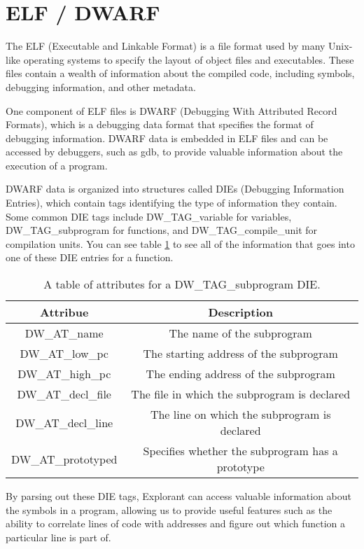 \section{ELF / DWARF}
The ELF (Executable and Linkable Format) is a file format used by many Unix-like operating systems to specify the layout of object files and executables. These files contain a wealth of information about the compiled code, including symbols, debugging information, and other metadata.

One component of ELF files is DWARF (Debugging With Attributed Record Formats), which is a debugging data format that specifies the format of debugging information. DWARF data is embedded in ELF files and can be accessed by debuggers, such as gdb, to provide valuable information about the execution of a program.

DWARF data is organized into structures called DIEs (Debugging Information Entries), which contain tags identifying the type of information they contain. Some common DIE tags include DW\_TAG\_variable for variables, DW\_TAG\_subprogram for functions, and DW\_TAG\_compile\_unit for compilation units. You can see table \ref{fig:subprogram_die} to see all of the information that goes into one of these DIE entries for a function.  

\begin{table}
\centering
\begin{tabular}{|c|c|}
\hline
\textbf{Attribue} & \textbf{Description} \\ \hline
DW\_AT\_name & The name of the subprogram \\ \hline
DW\_AT\_low\_pc & The starting address of the subprogram \\ \hline
DW\_AT\_high\_pc & The ending address of the subprogram \\ \hline
DW\_AT\_decl\_file & The file in which the subprogram is declared \\ \hline
DW\_AT\_decl\_line & The line on which the subprogram is declared \\ \hline
DW\_AT\_prototyped & Specifies whether the subprogram has a prototype \\ \hline
\end{tabular}
\caption{A table of attributes for a DW\_TAG\_subprogram DIE.}
    \label{fig:subprogram_die}
\end{table}

By parsing out these DIE tags, Explorant can access valuable information about the symbols in a program, allowing us to provide useful features such as the ability to correlate lines of code with addresses and figure out which function a particular line is part of. 

